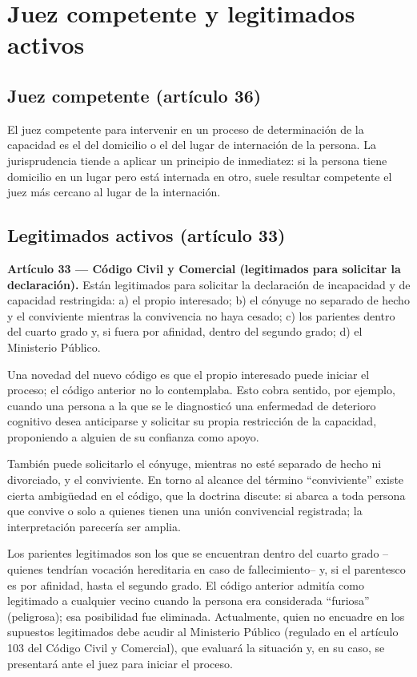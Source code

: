 \documentclass[12pt,oneside]{book}
\begin{document}
\section{Juez competente y legitimados activos}

\subsection{Juez competente (artículo 36)}

El juez competente para intervenir en un proceso de determinación de la capacidad es el del domicilio o el del lugar de internación de la persona. La jurisprudencia tiende a aplicar un principio de inmediatez: si la persona tiene domicilio en un lugar pero está internada en otro, suele resultar competente el juez más cercano al lugar de la internación.

\subsection{Legitimados activos (artículo 33)}

\begin{important}
\textbf{Artículo 33 --- Código Civil y Comercial (legitimados para solicitar la declaración).} Están legitimados para solicitar la declaración de incapacidad y de capacidad restringida: a) el propio interesado; b) el cónyuge no separado de hecho y el conviviente mientras la convivencia no haya cesado; c) los parientes dentro del cuarto grado y, si fuera por afinidad, dentro del segundo grado; d) el Ministerio Público.
\end{important}

Una novedad del nuevo código es que el propio interesado puede iniciar el proceso; el código anterior no lo contemplaba. Esto cobra sentido, por ejemplo, cuando una persona a la que se le diagnosticó una enfermedad de deterioro cognitivo desea anticiparse y solicitar su propia restricción de la capacidad, proponiendo a alguien de su confianza como apoyo.

También puede solicitarlo el cónyuge, mientras no esté separado de hecho ni divorciado, y el conviviente. En torno al alcance del término ``conviviente'' existe cierta ambigüedad en el código, que la doctrina discute: si abarca a toda persona que convive o solo a quienes tienen una unión convivencial registrada; la interpretación parecería ser amplia.

Los parientes legitimados son los que se encuentran dentro del cuarto grado --quienes tendrían vocación hereditaria en caso de fallecimiento-- y, si el parentesco es por afinidad, hasta el segundo grado. El código anterior admitía como legitimado a cualquier vecino cuando la persona era considerada ``furiosa'' (peligrosa); esa posibilidad fue eliminada. Actualmente, quien no encuadre en los supuestos legitimados debe acudir al Ministerio Público (regulado en el artículo 103 del Código Civil y Comercial), que evaluará la situación y, en su caso, se presentará ante el juez para iniciar el proceso.
\end{document}
